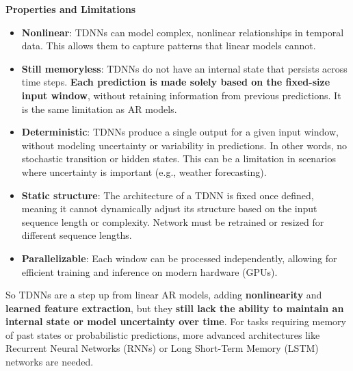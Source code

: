 \highspace
\begin{flushleft}
    \textcolor{Red2}{ \textbf{Properties and Limitations}}
\end{flushleft}
\begin{itemize}
    \item[\textcolor{Green3}{\faIcon{check}}] \textbf{Nonlinear}: TDNNs can model complex, nonlinear relationships in temporal data. This allows them to capture patterns that linear models cannot.
    \item[\textcolor{Red2}{\faIcon{times}}] \textbf{Still memoryless}: TDNNs do not have an internal state that persists across time steps. \textbf{Each prediction is made solely based on the fixed-size input window}, without retaining information from previous predictions. It is the same limitation as AR models.
    \item[\textcolor{Red2}{\faIcon{times}}] \textbf{Deterministic}: TDNNs produce a single output for a given input window, without modeling uncertainty or variability in predictions. In other words, no stochastic transition or hidden states. This can be a limitation in scenarios where uncertainty is important (e.g., weather forecasting).
    \item[\textcolor{Red2}{\faIcon{times}}] \textbf{Static structure}: The architecture of a TDNN is fixed once defined, meaning it cannot dynamically adjust its structure based on the input sequence length or complexity. Network must be retrained or resized for different sequence lengths.
    \item[\textcolor{Green3}{\faIcon{check}}] \textbf{Parallelizable}: Each window can be processed independently, allowing for efficient training and inference on modern hardware (GPUs).
\end{itemize}
So TDNNs are a step up from linear AR models, adding \textbf{nonlinearity} and \textbf{learned feature extraction}, but they \textbf{still lack the ability to maintain an internal state or model uncertainty over time}. For tasks requiring memory of past states or probabilistic predictions, more advanced architectures like Recurrent Neural Networks (RNNs) or Long Short-Term Memory (LSTM) networks are needed.

